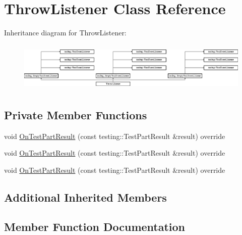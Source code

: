 \hypertarget{class_throw_listener}{}\section{Throw\+Listener Class Reference}
\label{class_throw_listener}
Inheritance diagram for Throw\+Listener\+:\begin{figure}[H]
\begin{center}
\leavevmode
\includegraphics[height=2.380952cm]{d2/d1c/class_throw_listener}
\end{center}
\end{figure}
\subsection*{Private Member Functions}
\begin{DoxyCompactItemize}
\item 
void \mbox{\hyperlink{class_throw_listener_a7756195364cd836b096cd107d46d5ae8}{On\+Test\+Part\+Result}} (const testing\+::\+Test\+Part\+Result \&result) override
\item 
void \mbox{\hyperlink{class_throw_listener_a7756195364cd836b096cd107d46d5ae8}{On\+Test\+Part\+Result}} (const testing\+::\+Test\+Part\+Result \&result) override
\item 
void \mbox{\hyperlink{class_throw_listener_a7756195364cd836b096cd107d46d5ae8}{On\+Test\+Part\+Result}} (const testing\+::\+Test\+Part\+Result \&result) override
\end{DoxyCompactItemize}
\subsection*{Additional Inherited Members}


\subsection{Member Function Documentation}
\mbox{\label{class_throw_listener_a7756195364cd836b096cd107d46d5ae8}} 
